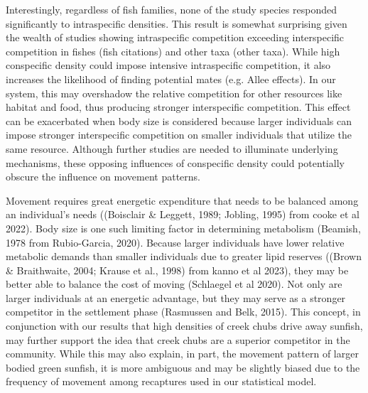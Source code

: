 \documentclass[11pt, class=article, crop=false]{standalone}
\begin{document}
Interestingly, regardless of fish families, none of the study species responded significantly to intraspecific densities. This result is somewhat surprising given the wealth of studies showing intraspecific competition exceeding interspecific competition in fishes \citep{}(fish citations) and other taxa \citep{adlerCompetitionCoexistencePlant2018, barabasEffectIntraInterspecific2016, thompsonProcessbasedMetacommunityFramework2020}(other taxa). While high conspecific density could impose intensive intraspecific competition, it also increases the likelihood of finding potential mates (e.g. Allee effects)\citep{terui 2015}. In our system, this may overshadow the relative competition for other resources like habitat and food, thus producing stronger interspecific competition. This effect can be exacerbated when body size is considered because larger individuals can impose stronger interspecific competition on smaller individuals that utilize the same resource. Although further studies are needed to illuminate underlying mechanisms, these opposing influences of conspecific density could potentially obscure the influence on movement patterns. 

Movement requires great energetic expenditure that needs to be balanced among an individual’s needs ((Boisclair \& Leggett, 1989; Jobling, 1995) from cooke et al 2022). Body size is one such limiting factor in determining metabolism (Beamish, 1978 from Rubio-Garcia, 2020). Because larger individuals have lower relative metabolic demands than smaller individuals due to greater lipid reserves ((Brown \& Braithwaite, 2004; Krause et al., 1998) from kanno et al 2023), they may be better able to balance the cost of moving (Schlaegel et al 2020). Not only are larger individuals at an energetic advantage, but they may serve as a stronger competitor in the settlement phase (Rasmussen and Belk, 2015). This concept, in conjunction with our results that high densities of creek chubs drive away sunfish, may further support the idea that creek chubs are a superior competitor in the community. While this may also explain, in part, the movement pattern of larger bodied green sunfish, it is more ambiguous and may be slightly biased due to the frequency of movement among recaptures used in our statistical model. 
\end{document}
